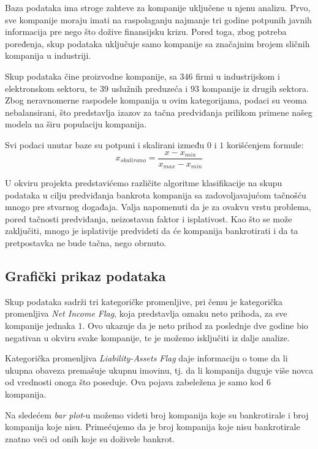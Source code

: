 \documentclass[12pt]{article}
\theoremstyle{definition}
\theoremstyle{remark}
\begin{document}
Baza podataka ima stroge zahteve za kompanije uključene u njenu analizu. Prvo, sve kompanije moraju imati na raspolaganju najmanje tri godine potpunih javnih informacija pre nego što dožive finansijsku krizu. Pored toga, zbog potreba poređenja, skup podataka uključuje samo kompanije sa značajnim brojem sličnih kompanija u industriji.

Skup podataka čine proizvodne kompanije, sa $346$ firmi u industrijskom i elektronskom sektoru, te $39$ uslužnih preduzeća i $93$ kompanije iz drugih sektora. Zbog neravnomerne raspodele kompanija u ovim kategorijama, podaci su veoma nebalansirani, što predstavlja izazov za tačna predviđanja prilikom primene našeg modela na širu populaciju kompanija.

Svi podaci unutar baze  su potpuni i skalirani između $0$ i $1$  korišćenjem formule: 
\begingroup
\large
$$x_{skalirano}=\frac{x-x_{min}}{x_{max}-x_{min}}$$
\endgroup

U okviru projekta predstavićemo različite algoritme klasifikacije na skupu podataka u cilju predviđanja bankrota kompanija sa zadovoljavajućom tačnošću mnogo pre stvarnog događaja.
Valja napomenuti da je za ovakvu vrstu problema, pored tačnosti predviđanja, neizostavan faktor i isplativost. Kao što se može zaključiti, mnogo je isplativije predvideti da će kompanija bankrotirati i da ta pretpostavka ne bude tačna, nego obrnuto.  

\subsection{Grafički prikaz podataka} 


Skup podataka sadrži tri kategoričke promenljive, pri čemu je kategorička promenljiva \emph{Net Income Flag}, koja predstavlja oznaku neto prihoda, za sve kompanije jednaka $1$.  Ovo ukazuje da je neto prihod za poslednje dve godine bio negativan u okviru svake kompanije, te je možemo isključiti iz dalje analize.

Kategorička promenljiva \emph{Liability-Assets Flag} daje informaciju o tome da li ukupna obaveza premašuje ukupnu imovinu, tj. da li kompanija duguje više novca od vrednosti onoga što poseduje. Ova pojava zabeležena je samo kod $6$ kompanija.

Na sledećem \emph{bar plot}-u možemo videti broj kompanija koje su bankrotirale i broj kompanija koje nisu. Primećujemo da je broj kompanija koje nisu bankrotirale znatno veći od onih koje su doživele bankrot.
\end{document}
